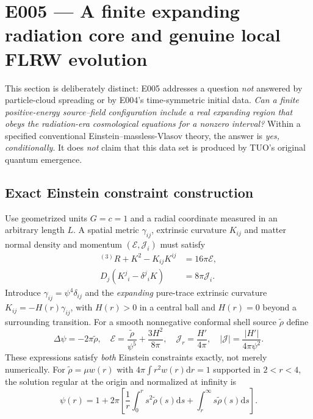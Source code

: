 \documentclass[11pt,a4paper]{article}
\newcommand{\dd}{\mathrm{d}}
\theoremstyle{tmon}
\theoremstyle{definition}
\begin{document}
\clearpage
\section{E005 --- A finite expanding radiation core and genuine local FLRW evolution}\label{sec:e005}
This section is deliberately distinct: E005 addresses a question \emph{not} answered by particle-cloud spreading or by E004's time-symmetric initial data. \emph{Can a finite positive-energy source--field configuration include a real expanding region that obeys the radiation-era cosmological equations for a nonzero interval?} Within a specified conventional Einstein--massless-Vlasov theory, the answer is \emph{yes, conditionally}. It does \emph{not} claim that this data set is produced by TUO's original quantum emergence.

\subsection{Exact Einstein constraint construction}
Use geometrized units $G=c=1$ and a radial coordinate measured in an arbitrary length $L$. A spatial metric $\gamma_{ij}$, extrinsic curvature $K_{ij}$ and matter normal density and momentum $(\mathcal E,\mathcal J_i)$ must satisfy
\begin{equation}\label{eq:e005constraints}
\boxed{\begin{aligned}
{}^{(3)}R+K^2-K_{ij}K^{ij}&=16\pi\mathcal E,\\
D_j(K^j{}_i-\delta^j{}_iK)&=8\pi\mathcal J_i.
\end{aligned}}
\end{equation}
Introduce $\gamma_{ij}=\psi^4\delta_{ij}$ and the \emph{expanding} pure-trace extrinsic curvature $K_{ij}=-H(r)\gamma_{ij}$, with $H(r)>0$ in a central ball and $H(r)=0$ beyond a surrounding transition. For a smooth nonnegative conformal shell source $\widetilde\rho$ define
\begin{equation}\label{eq:e005source}
\Delta\psi=-2\pi\widetilde\rho,\quad
\mathcal E=\frac{\widetilde\rho}{\psi^5}+\frac{3H^2}{8\pi},\quad
\boxed{\mathcal J_r=\frac{H'}{4\pi},\quad |\mathcal J|=\frac{|H'|}{4\pi\psi^2}.}
\end{equation}
These expressions satisfy \emph{both} Einstein constraints exactly, not merely numerically. For $\widetilde\rho=\mu w(r)$ with $4\pi\int r^2w(r)\dd r=1$ supported in $2<r<4$, the solution regular at the origin and normalized at infinity is
\begin{equation}\label{eq:e005psi}
\psi(r)=1+2\pi\left[\frac1r\int_0^r s^2\widetilde\rho(s)\dd s+\int_r^\infty s\widetilde\rho(s)\dd s\right].
\end{equation}
\end{document}
